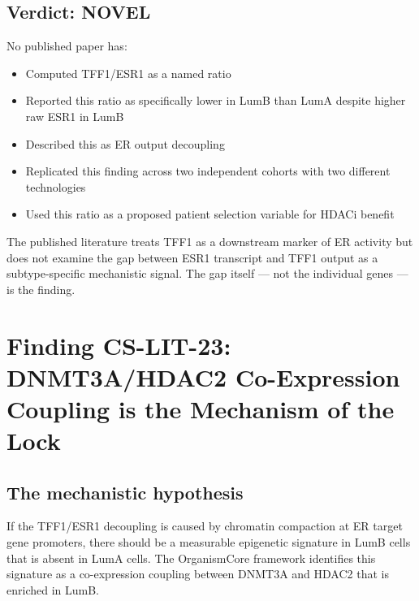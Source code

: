 \documentclass[12pt, a4paper]{article}
\begin{document}
\subsection{Verdict: NOVEL}

\begin{center}
\colorbox{novelbox}{
\begin{minipage}{0.85\textwidth}
\vspace{0.5em}
No published paper has:
\begin{itemize}[noitemsep]
  \item Computed TFF1/ESR1 as a named ratio
  \item Reported this ratio as specifically lower in
        LumB than LumA despite higher raw ESR1 in LumB
  \item Described this as ER output decoupling
  \item Replicated this finding across two independent
        cohorts with two different technologies
  \item Used this ratio as a proposed patient selection
        variable for HDACi benefit
\end{itemize}
The published literature treats TFF1 as a downstream
marker of ER activity but does not examine the gap
between ESR1 transcript and TFF1 output as a
subtype-specific mechanistic signal. The gap itself
--- not the individual genes --- is the finding.
\vspace{0.4em}
\end{minipage}
}
\end{center}

\section{Finding CS-LIT-23: DNMT3A/HDAC2 Co-Expression
Coupling is the Mechanism of the Lock}

\subsection{The mechanistic hypothesis}

If the TFF1/ESR1 decoupling is caused by chromatin
compaction at ER target gene promoters, there should
be a measurable epigenetic signature in LumB cells
that is absent in LumA cells. The OrganismCore
framework identifies this signature as a co-expression
coupling between DNMT3A and HDAC2 that is enriched
in LumB.
\end{document}
